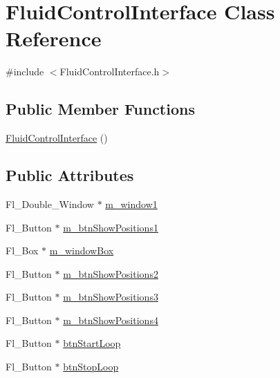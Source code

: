 \hypertarget{class_fluid_control_interface}{}\section{Fluid\+Control\+Interface Class Reference}
\label{class_fluid_control_interface}


{\ttfamily \#include $<$Fluid\+Control\+Interface.\+h$>$}

\subsection*{Public Member Functions}
\begin{DoxyCompactItemize}
\item 
\hyperlink{class_fluid_control_interface_a4cb172a43e95b2852f30807e9037a9d9}{Fluid\+Control\+Interface} ()
\end{DoxyCompactItemize}
\subsection*{Public Attributes}
\begin{DoxyCompactItemize}
\item 
Fl\+\_\+\+Double\+\_\+\+Window $\ast$ \hyperlink{class_fluid_control_interface_ab318bb377679cd76946bb68fc505652f}{m\+\_\+window1}
\item 
Fl\+\_\+\+Button $\ast$ \hyperlink{class_fluid_control_interface_aa98b7fdaecb2d588e5decc52f23919fb}{m\+\_\+btn\+Show\+Positions1}
\item 
Fl\+\_\+\+Box $\ast$ \hyperlink{class_fluid_control_interface_a04185b8fd0895dfc2b77a77c9eb61bc8}{m\+\_\+window\+Box}
\item 
Fl\+\_\+\+Button $\ast$ \hyperlink{class_fluid_control_interface_acc9ea2ec328a79737c722c6f7a3b236d}{m\+\_\+btn\+Show\+Positions2}
\item 
Fl\+\_\+\+Button $\ast$ \hyperlink{class_fluid_control_interface_acd3d58fda18fea04d02874461097c510}{m\+\_\+btn\+Show\+Positions3}
\item 
Fl\+\_\+\+Button $\ast$ \hyperlink{class_fluid_control_interface_a507c8f8707e6735a1f651e0cf9d5a51b}{m\+\_\+btn\+Show\+Positions4}
\item 
Fl\+\_\+\+Button $\ast$ \hyperlink{class_fluid_control_interface_a70b369e5c14edbf6415d2dc26c33b9d0}{btn\+Start\+Loop}
\item 
Fl\+\_\+\+Button $\ast$ \hyperlink{class_fluid_control_interface_a2074a5b56d8fb0e88f1f4da84dfc5296}{btn\+Stop\+Loop}
\end{DoxyCompactItemize}


